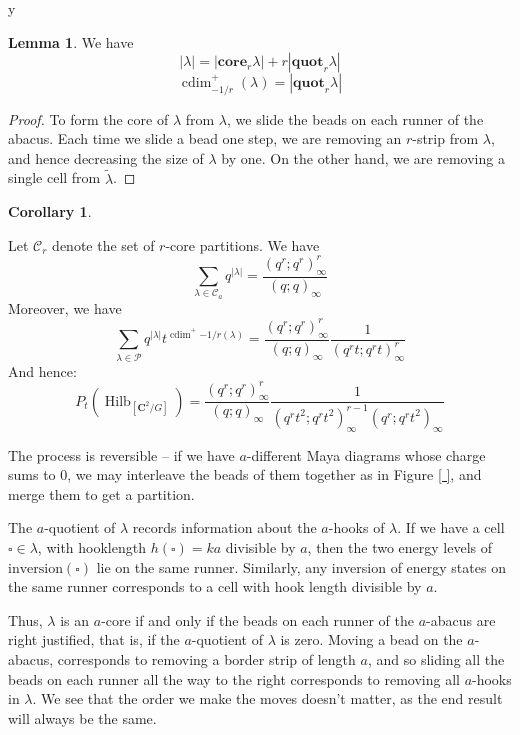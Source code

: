 y\documentclass{amsart}[12pt]
\theoremstyle{definition}
\newtheorem{lemma}[dummy]{Lemma}
\newtheorem{corollary}[dummy]{Corollary}
\newcommand{\C}{\mathbf{C}}
\newcommand{\core}{\mathbf{core}}
\newcommand{\quot}{\mathbf{quot}}
\DeclareMathOperator{\Hilb}{Hilb}
\DeclareMathOperator{\cdim}{cdim}
\begin{document}
\begin{lemma}
We have
$$|\lambda|=|\core_r{\lambda}|+r|\quot_r{\lambda}|$$
$$\cdim^+_{-1/r}(\lambda)=|\quot_r{\lambda}|$$
\end{lemma}

\begin{proof}
To form the core of $\lambda$ from $\lambda$, we slide the beads on each runner of the abacus.  Each time we slide a bead one step, we are removing an $r$-strip from $\lambda$, and hence decreasing the size of $\lambda$ by one.  On the other hand, we are removing a single cell from $\tilde{\lambda}$.


\end{proof}


\begin{corollary} \label{cor:product-formulas-traditional-cores}

Let $\mathcal{C}_r$ denote the set of $r$-core partitions.  We have
$$\sum_{\lambda\in\mathcal{C}_a} q^{|\lambda|}=\frac{(q^r;q^r)_\infty^r}{(q;q)_\infty}$$
Moreover, we have 
$$\sum_{\lambda\in\mathcal{P}} q^{|\lambda|} t^{\cdim^+{-1/r}(\lambda)}=\frac{(q^r;q^r)_\infty^r}{(q;q)_\infty}\frac{1}{(q^rt;q^rt)_\infty^r}$$
And hence:
$$P_t(\Hilb_{[\C^2/G]})=\frac{(q^r;q^r)_\infty^r}{(q;q)_\infty}\frac{1}{(q^rt^2;q^rt^2)_\infty^{r-1}(q^r;q^rt^2)_\infty}$$
\end{corollary}





The process is reversible -- if we have $a$-different Maya diagrams whose charge sums to $0$, we may interleave the beads of them together as in Figure \ref{ }, and merge them to get a partition.  


The $a$-quotient of $\lambda$ records information about the $a$-hooks of $\lambda$.  If we have a cell $\square\in\lambda$,  with hooklength $h(\square)=ka$ divisible by $a$, then the two energy levels of $\textrm{inversion}(\square)$ lie on the same runner.  Similarly, any inversion of energy states on the same runner corresponds to a cell with hook length divisible by $a$.  

Thus, $\lambda$ is an $a$-core if and only if the beads on each runner of the $a$-abacus are right justified, that is, if the $a$-quotient of $\lambda$ is zero.  Moving a bead on the $a$-abacus, corresponds to removing a border strip of length $a$, and so sliding all the beads on each runner all the way to the right corresponds to removing all $a$-hooks in $\lambda$.  We see that the order we make the moves doesn't matter, as the end result will always be the same.
\end{document}
